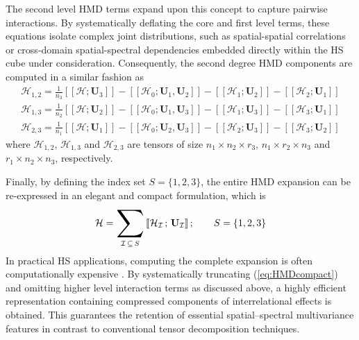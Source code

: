\documentclass[12pt,onecolumn]{article}
\newcommand{\kruskal}[1]{\left[\!\left[#1\right]\!\right]}
\newcommand{\bigsum}{\mathop{\vcenter{\hbox{\scalebox{2.0}{$\displaystyle\sum$}}}}}
\begin{document}
The second level HMD terms expand upon this concept to capture pairwise interactions. By systematically deflating the core and first level terms, these equations isolate complex joint distributions, such as spatial-spatial correlations or cross-domain spatial-spectral dependencies embedded directly within the HS cube under consideration. Consequently, the second degree HMD components are computed in a similar fashion as
\begin{eqnarray}
\label{eq:Xij}
\mathcal{H}_{1,2} = \frac{1}{n_3} \kruskal{ \mathcal{H}; \mathbf{U}_3} -
\kruskal{ \mathcal{H}_0; \mathbf{U}_1, \mathbf{U}_2} - \kruskal{\mathcal{H}_1; \mathbf{U}_2 } - \kruskal{\mathcal{H}_2; \mathbf{U}_1 } \nonumber \\
\mathcal{H}_{1,3} = \frac{1}{n_2} \kruskal{ \mathcal{H}; \mathbf{U}_2} -
\kruskal{ \mathcal{H}_0; \mathbf{U}_1, \mathbf{U}_3} - \kruskal{\mathcal{H}_1; \mathbf{U}_3 } - \kruskal{\mathcal{H}_3; \mathbf{U}_1 } \nonumber \\
\mathcal{H}_{2,3} = \frac{1}{n_1} \kruskal{ \mathcal{H}; \mathbf{U}_1} -
\kruskal{ \mathcal{H}_0; \mathbf{U}_2, \mathbf{U}_3} - \kruskal{\mathcal{H}_2; \mathbf{U}_3 } - \kruskal{\mathcal{H}_3; \mathbf{U}_2 }
\end{eqnarray}
where $\mathcal{H}_{1,2}$, $\mathcal{H}_{1,3}$ and $\mathcal{H}_{2,3}$ are tensors of size $n_1\times n_2\times r_3$, $n_1\times r_2\times n_3$ and $r_1\times n_2\times n_3$, respectively.

Finally, by defining the index set $S = \{1, 2, 3\}$, the entire HMD expansion can be re-expressed in an elegant and compact formulation, which is %
\begin{equation}
\label{eq:HMDcompact}
\mathcal{H} = \bigsum_{\mathcal{I}\, \subseteq\, S} \kruskal{ \mathcal{H}_\mathcal{I}\,;\, \mathbf{U}_{\mathcal{I}}}; \qquad S = \{1, 2, 3\}
\end{equation}
In practical HS applications, computing the complete expansion is often computationally expensive \cite{tuna_tgrs,enis}. By systematically truncating (\ref{eq:HMDcompact}) and omitting higher level interaction terms as discussed above, a highly efficient representation containing compressed components of interrelational effects is obtained. This guarantees the retention of essential spatial–spectral multivariance features in contrast to conventional tensor decomposition techniques.
\end{document}
